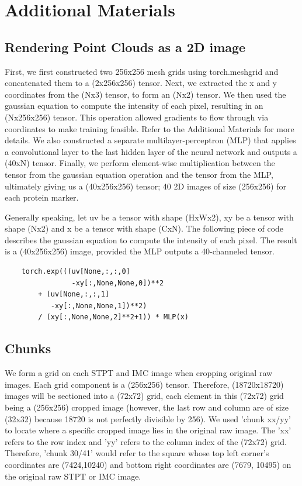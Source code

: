 \documentclass[10pt,twocolumn,letterpaper]{article}
\begin{document}
\pagebreak

\section{Additional Materials}
\subsection{Rendering Point Clouds as a 2D image}
First, we first constructed two 256x256 mesh grids using torch.meshgrid and concatenated them to a (2x256x256) tensor. Next, we extracted the x and y coordinates from the (Nx3) tensor, to form an (Nx2) tensor. We then used the gaussian equation to compute the intensity of each pixel, resulting in an (Nx256x256) tensor. This operation allowed gradients to flow through via coordinates to make training feasible. Refer to the Additional Materials for more details. We also constructed a separate multilayer-perceptron (MLP) that applies a convolutional layer to the last hidden layer of the neural network and outputs a (40xN) tensor. Finally, we perform element-wise multiplication between the tensor from the gaussian equation operation and the tensor from the MLP, ultimately giving us a (40x256x256) tensor; 40 2D images of size (256x256) for each protein marker. 


Generally speaking, let uv be a tensor with shape (HxWx2), xy be a tensor with shape (Nx2) and x be a tensor with shape (CxN). The following piece of code describes the gaussian equation to compute the intensity of each pixel. The result is a (40x256x256) image, provided the MLP outputs a 40-channeled tensor.

\begin{verbatim}
	torch.exp(((uv[None,:,:,0]
	            -xy[:,None,None,0])**2
	    + (uv[None,:,:,1]
	       -xy[:,None,None,1])**2)
	    / (xy[:,None,None,2]**2+1)) * MLP(x)
\end{verbatim}

\subsection{Chunks}
We form a grid on each STPT and IMC image when cropping original raw images. Each grid component is a (256x256) tensor. Therefore, (18720x18720) images will be sectioned into a (72x72) grid, each element in this (72x72) grid being a (256x256) cropped image (however, the last row and column are of size (32x32) because 18720 is not perfectly divisible by 256). We used 'chunk xx/yy' to locate where a specific cropped image lies in the original raw image. The 'xx' refers to the row index and 'yy' refers to the column index of the (72x72) grid. Therefore, 'chunk 30/41' would refer to the square whose top left corner's coordinates are (7424,10240) and bottom right coordinates are (7679, 10495) on the original raw STPT or IMC image.



{\small


}
\end{document}
